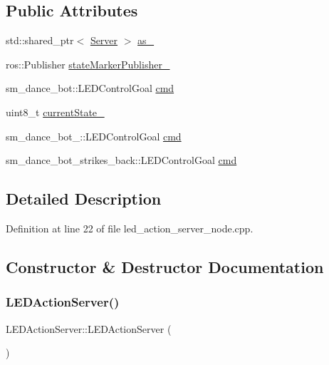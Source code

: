 \subsection*{Public Attributes}
\begin{DoxyCompactItemize}
\item 
std\+::shared\+\_\+ptr$<$ \hyperlink{odom__tracker__node_8cpp_a9884574d0480319430f628f79afc0500}{Server} $>$ \hyperlink{classLEDActionServer_a61d21c77642081acf017d4ebd65b2de0}{as\+\_\+}
\item 
ros\+::\+Publisher \hyperlink{classLEDActionServer_a4168a1e4a17eb1d65aaa059ce0c52086}{state\+Marker\+Publisher\+\_\+}
\item 
sm\+\_\+dance\+\_\+bot\+::\+L\+E\+D\+Control\+Goal \hyperlink{classLEDActionServer_a4d3a4c07e7659cdd78228932bb1634d3}{cmd}
\item 
uint8\+\_\+t \hyperlink{classLEDActionServer_a1dc456e987dc331501ad6ff2215661ff}{current\+State\+\_\+}
\item 
sm\+\_\+dance\+\_\+bot\+\_\+::\+L\+E\+D\+Control\+Goal \hyperlink{classLEDActionServer_a754ac14e0c9bde99ae28feb59c0801c0}{cmd}
\item 
sm\+\_\+dance\+\_\+bot\+\_\+strikes\+\_\+back\+::\+L\+E\+D\+Control\+Goal \hyperlink{classLEDActionServer_a219e3a4ae2a09887d601bc9b210294dd}{cmd}
\end{DoxyCompactItemize}


\subsection{Detailed Description}


Definition at line 22 of file led\+\_\+action\+\_\+server\+\_\+node.\+cpp.



\subsection{Constructor \& Destructor Documentation}
\mbox{\label{classLEDActionServer_a6978c43940438b9fd8bfcd6b443092d3}} 
\subsubsection{\texorpdfstring{L\+E\+D\+Action\+Server()}{LEDActionServer()}\hspace{0.1cm}{\footnotesize\ttfamily [1/3]}}
{\footnotesize\ttfamily L\+E\+D\+Action\+Server\+::\+L\+E\+D\+Action\+Server (\begin{DoxyParamCaption}{ }\end{DoxyParamCaption})\hspace{0.3cm}{\ttfamily [inline]}}

